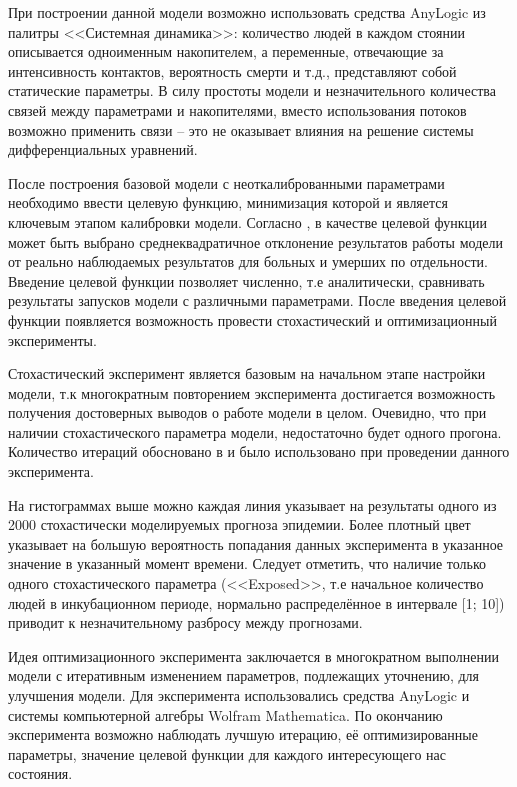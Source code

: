 При построении данной модели возможно использовать средства AnyLogic из палитры <<Системная динамика>>: количество людей в каждом стоянии описывается одноименным накопителем, а переменные, отвечающие за интенсивность контактов, вероятность смерти и т.д., представляют собой статические параметры. В силу простоты модели и незначительного количества связей между параметрами и накопителями, вместо использования потоков возможно применить связи -- это не оказывает влияния на решение системы дифференциальных уравнений. 

После построения базовой модели с неоткалиброванными параметрами необходимо ввести целевую функцию, минимизация которой и является ключевым этапом калибровки модели. Согласно  %
, в качестве  целевой функции может быть выбрано среднеквадратичное отклонение результатов работы модели от  реально наблюдаемых результатов для больных и  умерших  по отдельности. Введение целевой функции позволяет численно, т.е аналитически, сравнивать результаты запусков модели с различными параметрами.
После введения целевой функции появляется возможность провести стохастический и оптимизационный эксперименты.

Стохастический эксперимент является базовым на начальном этапе настройки модели, т.к многократным повторением эксперимента достигается возможность получения достоверных выводов о работе модели в целом. Очевидно, что при наличии стохастического параметра модели, недостаточно будет одного прогона. Количество итераций обосновано в  %
и было использовано при проведении данного эксперимента. 


На гистограммах выше можно каждая линия указывает на результаты одного из 2000 стохастически моделируемых прогноза эпидемии.  Более плотный цвет указывает на большую вероятность попадания данных эксперимента в указанное значение в указанный момент времени. Следует отметить, что наличие только одного стохастического параметра (<<Exposed>>, т.е начальное количество людей в инкубационном периоде, нормально распределённое в интервале [1; 10]) приводит  к незначительному разбросу между прогнозами.

Идея  оптимизационного  эксперимента заключается в многократном выполнении модели с итеративным изменением параметров, подлежащих уточнению, для улучшения модели. Для эксперимента использовались средства AnyLogic  и системы компьютерной алгебры Wolfram Mathematica. По окончанию эксперимента возможно наблюдать лучшую итерацию, её оптимизированные параметры, значение целевой функции для каждого интересующего нас состояния.

